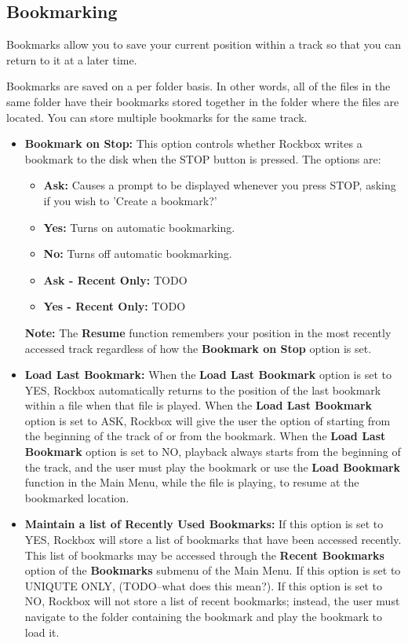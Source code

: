   \subsection{\label{ref:Bookmarkconfigactual}Bookmarking}
  Bookmarks allow you to save your current position within a track so that you can return to it at a later time.

	Bookmarks are saved on a per folder basis. In other words, all of the files in the same folder have their bookmarks stored together in the folder where the files are located. You can store multiple bookmarks for the same track.
  \begin{itemize}
  \item \textbf{Bookmark on Stop:  }
  	This option controls whether Rockbox writes a bookmark to the disk when the STOP button is pressed.  The options are:
  	\begin{itemize}
  	\item \textbf{Ask:  }Causes a prompt to be displayed whenever you press STOP, asking if you wish to 'Create a bookmark?'
  	\item \textbf{Yes:  }Turns on automatic bookmarking.
  	\item \textbf{No:  }Turns off automatic bookmarking.
  	\item \textbf{Ask - Recent Only:  }TODO
  	\item \textbf{Yes - Recent Only:  }TODO
		\end{itemize}
		\textbf{Note:  }The \textbf{Resume} function remembers your position in the most recently accessed track regardless of how the \textbf{Bookmark on Stop} option is set.
    
  \item \textbf{Load Last Bookmark:}
    When the \textbf{Load Last Bookmark} option is set to YES, Rockbox automatically returns to the position of the last bookmark within a file when that file is played. When the \textbf{Load Last Bookmark} option is set to ASK, Rockbox will give the user the option of starting from the beginning of the track of or from the bookmark. When the \textbf{Load Last Bookmark} option is set to NO, playback always starts from the beginning of the track, and the user must play the bookmark or use the \textbf{Load Bookmark} function in the Main Menu, while the file is playing, to resume at the bookmarked location.
  \item \textbf{Maintain a list of Recently Used Bookmarks:}
    If this option is set to YES, Rockbox will store a list of bookmarks that have been accessed recently.  This list of bookmarks may be accessed through the \textbf{Recent Bookmarks} option of the \textbf{Bookmarks} submenu of the Main Menu.  If this option is set to UNIQUTE ONLY, (TODO--what does this mean?).  If this option is set to NO, Rockbox will not store a list of recent bookmarks; instead, the user must navigate to the folder containing the bookmark and play the bookmark to load it.
  \end{itemize}